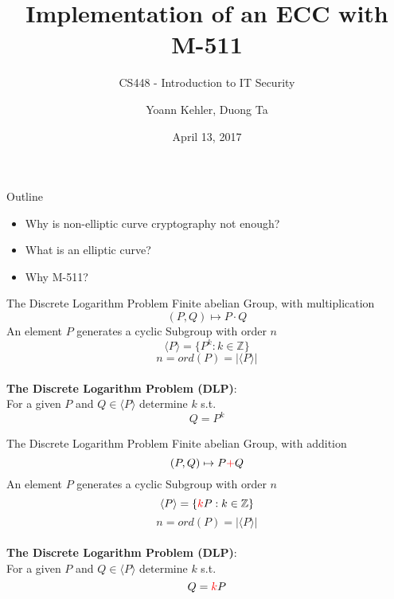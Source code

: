 \documentclass{beamer}
\begin{document}
\title{Implementation of an ECC with M-511} 
\subtitle{CS448 - Introduction to IT Security}
\author{Yoann Kehler, Duong Ta}
\date{April 13, 2017} 

\begin{frame}
\titlepage
\end{frame} 

\begin{frame}{Outline}
\begin{itemize}
	\item Why is non-elliptic curve cryptography not enough?
	\item What is an elliptic curve?
	\item Why M-511?
\end{itemize}
\end{frame} 
\begin{frame}{The Discrete Logarithm Problem\cite{werner2013elliptische}}
	Finite abelian Group, with multiplication\\
	\[(P,Q) \mapsto P \cdot Q\]
	\pause
	An element $P$ generates a cyclic Subgroup with order $n$\\
	\[\langle P \rangle = \{P^k : k \in \mathbb{Z} \} \]
	\[n = ord(P) = |\langle P \rangle| \]\\ \vspace{0.5cm}
	\pause
	\textbf{The Discrete Logarithm Problem (DLP)}: \\
	For a given $P$ and $Q \in \langle P \rangle$ determine $k$ s.t. \\
	\[Q=P^k\]
\end{frame}
\begin{frame}{The Discrete Logarithm Problem\cite{werner2013elliptische}}
Finite abelian Group, with \textcolor[rgb]{1.00,0.00,0.00}{addition}\\
\[(P,Q) \mapsto P \textcolor[rgb]{1.00,0.00,0.00}{+} Q\]
An element $P$ generates a cyclic Subgroup with order $n$\\
\[\langle P \rangle = \{\textcolor[rgb]{1.00,0.00,0.00}{k}P : k \in \mathbb{Z} \} \]
\[n = ord(P) = |\langle P \rangle| \]\\ \vspace{0.5cm}
\textbf{The Discrete Logarithm Problem (DLP)}: \\
For a given $P$ and $Q \in \langle P \rangle$ determine $k$ s.t. \\
\[Q=\textcolor[rgb]{1.00,0.00,0.00}{k}P\]

\end{frame}
\end{document}
